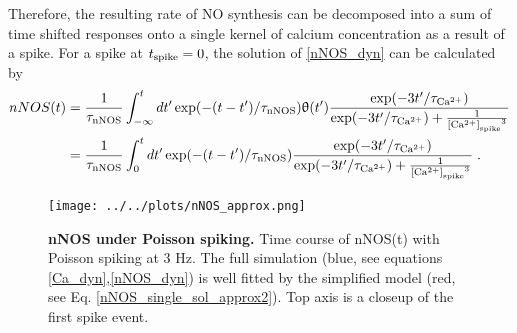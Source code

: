 \documentclass[10pt,letterpaper]{article}
\begin{document}
Therefore, the resulting rate of NO synthesis can be decomposed into a sum of time shifted responses onto a single kernel of calcium concentration as a result of a spike. For a spike at $t_{\rm spike}=0$, the solution of \eqref{nNOS_dyn} can be calculated by
\begin{equation}
\begin{split}
nNOS(t) &= \frac{1}{\tau_{\rm nNOS}}\int_{-\infty}^t dt' \exp(-(t-t')/\tau_{\rm nNOS}) \uptheta(t') \frac{\exp(-3t'/\tau_{\rm Ca^{2+}})}{\exp(-3t'/\tau_{\rm Ca^{2+}}) + \frac{1}{{{\rm [Ca^{2+}]}_{\rm spike}}^3}} \\
&= \frac{1}{\tau_{\rm nNOS}}\int_{0}^t dt' \exp(-(t-t')/\tau_{\rm nNOS}) \frac{\exp(-3t'/\tau_{\rm Ca^{2+}})}{\exp(-3t'/\tau_{\rm Ca^{2+}}) + \frac{1}{{{\rm [Ca^{2+}]}_{\rm spike}}^3}}\;.
\end{split}\label{nNOS_single_sol}
\end{equation}

\begin{figure}
\begin{center}
\texttt{[image: ../../plots/nNOS\_approx.png]}
\end{center}
\caption{{\bf nNOS under Poisson spiking.} Time course of nNOS(t) with Poisson spiking at 3 Hz. The full simulation (blue, see equations \eqref{Ca_dyn},\eqref{nNOS_dyn}) is well fitted by the simplified model (red, see Eq. \eqref{nNOS_single_sol_approx2}). Top axis is a closeup of the first spike event.}
\label{nNOS_approx_plot}
\end{figure}
\end{document}
